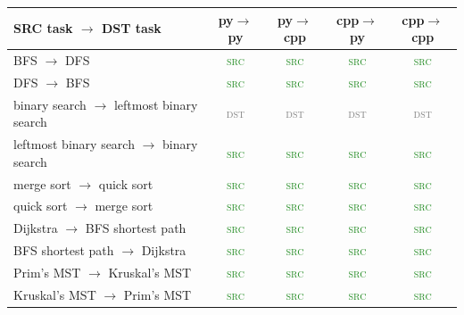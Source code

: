\begin{table}[h!]
\centering
\small
\setlength{\tabcolsep}{4pt}
\begin{tabular}{lcccc}
\toprule
SRC task $\to$ DST task & py$\to$py & py$\to$cpp & cpp$\to$py & cpp$\to$cpp \\
\midrule
BFS $\to$ DFS & \textcolor{ForestGreen}{\textsc{src}} & \textcolor{ForestGreen}{\textsc{src}} & \textcolor{ForestGreen}{\textsc{src}} & \textcolor{ForestGreen}{\textsc{src}} \\
DFS $\to$ BFS & \textcolor{ForestGreen}{\textsc{src}} & \textcolor{ForestGreen}{\textsc{src}} & \textcolor{ForestGreen}{\textsc{src}} & \textcolor{ForestGreen}{\textsc{src}} \\
binary search $\to$ leftmost binary search & \textcolor{gray}{\textsc{dst}} & \textcolor{gray}{\textsc{dst}} & \textcolor{gray}{\textsc{dst}} & \textcolor{gray}{\textsc{dst}} \\
leftmost binary search $\to$ binary search & \textcolor{ForestGreen}{\textsc{src}} & \textcolor{ForestGreen}{\textsc{src}} & \textcolor{ForestGreen}{\textsc{src}} & \textcolor{ForestGreen}{\textsc{src}} \\
merge sort $\to$ quick sort & \textcolor{ForestGreen}{\textsc{src}} & \textcolor{ForestGreen}{\textsc{src}} & \textcolor{ForestGreen}{\textsc{src}} & \textcolor{ForestGreen}{\textsc{src}} \\
quick sort $\to$ merge sort & \textcolor{ForestGreen}{\textsc{src}} & \textcolor{ForestGreen}{\textsc{src}} & \textcolor{ForestGreen}{\textsc{src}} & \textcolor{ForestGreen}{\textsc{src}} \\
Dijkstra $\to$ BFS shortest path & \textcolor{ForestGreen}{\textsc{src}} & \textcolor{ForestGreen}{\textsc{src}} & \textcolor{ForestGreen}{\textsc{src}} & \textcolor{ForestGreen}{\textsc{src}} \\
BFS shortest path $\to$ Dijkstra & \textcolor{ForestGreen}{\textsc{src}} & \textcolor{ForestGreen}{\textsc{src}} & \textcolor{ForestGreen}{\textsc{src}} & \textcolor{ForestGreen}{\textsc{src}} \\
Prim's MST $\to$ Kruskal's MST & \textcolor{ForestGreen}{\textsc{src}} & \textcolor{ForestGreen}{\textsc{src}} & \textcolor{ForestGreen}{\textsc{src}} & \textcolor{ForestGreen}{\textsc{src}} \\
Kruskal's MST $\to$ Prim's MST & \textcolor{ForestGreen}{\textsc{src}} & \textcolor{ForestGreen}{\textsc{src}} & \textcolor{ForestGreen}{\textsc{src}} & \textcolor{ForestGreen}{\textsc{src}} \\

\end{tabular}
\end{table}
